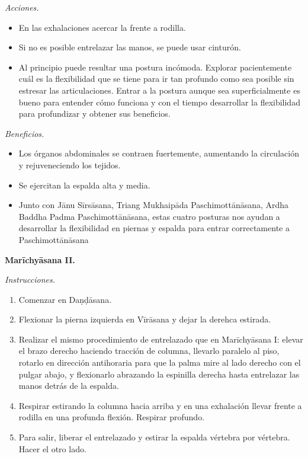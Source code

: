 \emph{Acciones.}
\begin{itemize}
\item En las exhalaciones acercar la frente a
rodilla.
\item Si no es posible entrelazar las manos,
se puede usar cinturón.
\item Al principio puede resultar una postura
incómoda. Explorar pacientemente cuál es la
flexibilidad que se tiene para ir tan
profundo como sea posible sin estresar las
articulaciones. Entrar a la postura aunque
sea superficialmente es bueno para entender
cómo funciona y con el tiempo desarrollar la
flexibilidad para profundizar y obtener sus
beneficios.
\end{itemize}

\emph{Beneficios.}
\begin{itemize}
\item Los órganos abdominales se contraen
fuertemente, aumentando la circulación y
rejuveneciendo los tejidos.
\item Se ejercitan la espalda alta y media.
\item Junto con Jānu Sīrsāsana, Triang
Mukhaipāda Paschimottānāsana, Ardha Baddha
Padma Paschimottānāsana, estas cuatro
posturas nos ayudan a desarrollar la
flexibilidad en piernas y espalda para entrar
correctamente a Paschimottānāsana
\end{itemize}

\medskip\noindent\textbf{Marīchyāsana II.}

\emph{Instrucciones.}
\begin{enumerate}
\item Comenzar en Daṇḍāsana.
\item Flexionar la pierna izquierda en
Vīrāsana y dejar la derehca estirada.
\item Realizar el mismo procedimiento de
entrelazado que en Marīchyāsana I: elevar el
brazo derecho haciendo tracción de columna,
llevarlo paralelo al piso, rotarlo en
dirección antihoraria para que la palma mire
al lado derecho con el pulgar abajo, y
flexionarlo abrazando la espinilla derecha
hasta entrelazar las manos detrás de la
espalda.
\item Respirar estirando la columna hacia
arriba y en una exhalación llevar frente a
rodilla en una profunda flexión. Respirar
profundo.
\item Para salir, liberar el entrelazado y
estirar la espalda vértebra por vértebra.
Hacer el otro lado.
\end{enumerate}

